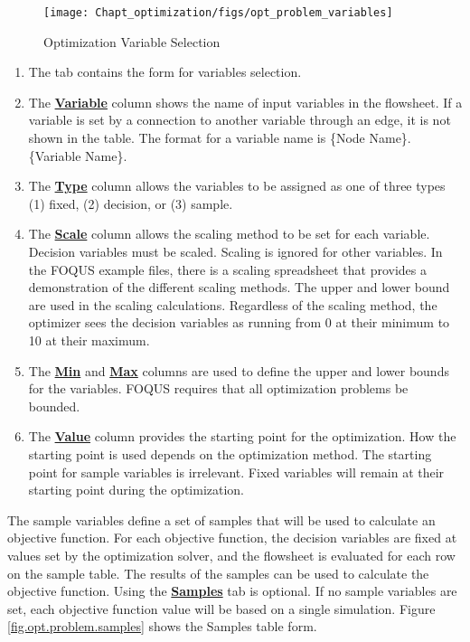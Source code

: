 \begin{figure}[H]
	\begin{center}
		\texttt{[image: Chapt\_optimization/figs/opt\_problem\_variables]}
		\caption{Optimization Variable Selection}
		\label{fig.opt.problem.variables}
	\end{center}
\end{figure}

\begin{enumerate}
	\item The  tab contains the form for variables selection.
	\item The \textbf{\underline{Variable}} column shows the name of input variables in the flowsheet. If a variable is set by a connection to another variable through an edge, it is not shown in the table. The format for a variable name is \{Node Name\}.\{Variable Name\}.
	\item The \textbf{\underline{Type}} column allows the variables to be assigned as one of three types (1) fixed, (2) decision, or (3) sample.
	\item The \textbf{\underline{Scale}} column allows the scaling method to be set for each variable. Decision variables must be scaled. Scaling is ignored for other variables. In the FOQUS example files, there is a scaling spreadsheet that provides a demonstration of the different scaling methods. The upper and lower bound are used in the scaling calculations. Regardless of the scaling method, the optimizer sees the decision variables as running from 0 at their minimum to 10 at their maximum. 
	\item The \textbf{\underline{Min}} and \textbf{\underline{Max}} columns are used to define the upper and lower bounds for the variables. FOQUS requires that all optimization problems be bounded.
	\item The \textbf{\underline{Value}} column provides the starting point for the optimization. How the starting point is used depends on the optimization method. The starting point for sample variables is irrelevant. Fixed variables will remain at their starting point during the optimization.
\end{enumerate}

The sample variables define a set of samples that will be used to calculate an objective function. For each objective function, the decision variables are fixed at values set by the optimization solver, and the flowsheet is evaluated for each row on the sample table. The results of the samples can be used to calculate the objective function. Using the \textbf{\underline{Samples}} tab is optional. If no sample variables are set, each objective function value will be based on a single simulation. Figure \ref{fig.opt.problem.samples} shows the Samples table form.   

